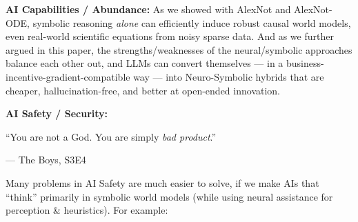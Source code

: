 \documentclass[11pt]{article}
\renewenvironment{quote}
  {\begin{tcolorbox}[enhanced, breakable, sharp corners, frame hidden,
     colback=quotebg, borderline west={3pt}{0pt}{quotebar},
     left=8pt, right=8pt, top=5pt, bottom=5pt,
     before upper={\setlength{\parskip}{0.6em}}]}
  {\end{tcolorbox}}
\begin{document}
\textbf{AI Capabilities / Abundance:} As we showed with AlexNot and AlexNot-ODE, symbolic reasoning \textit{alone} can efficiently induce robust causal world models, even real-world scientific equations from noisy sparse data. And as we further argued in this paper, the strengths/weaknesses of the neural/symbolic approaches balance each other out, and LLMs can convert themselves — in a business-incentive-gradient-compatible way — into Neuro-Symbolic hybrids that are cheaper, hallucination-free, and better at open-ended innovation.

\textbf{AI Safety / Security:}
\begin{quote}
“You are not a God. You are simply \textit{bad product}.”

— The Boys, S3E4
\end{quote}
Many problems in AI Safety \citep{concrete_problems} are much easier to solve, if we make AIs that “think” primarily in symbolic world models (while using neural assistance for perception \& heuristics). For example:
\end{document}
